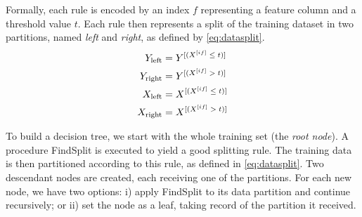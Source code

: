 Formally, each rule is encoded by an index $f$ representing a feature column and a threshold value $t$. Each rule then represents a split of the training dataset in two partitions, named \emph{left} and \emph{right}, as defined by \autoref{eq:datasplit}.
%
\begin{equation}
    \begin{split} %
        Y_\text{left} &=Y\el{(X\el{if} \; \le \; t)} \\
        Y_\text{right} &=Y\el{(X\el{if} \; > \; t)} \\
        X_\text{left} &=X\el{(X\el{if} \; \le \; t)} \\
        X_\text{right} &=X\el{(X\el{if} \; > \; t)}
    \end{split}
    \label{eq:datasplit}
\end{equation}

To build a decision tree, we start with the whole training set (the \emph{root node}). A procedure FindSplit is executed to yield a good splitting rule.
The training data is then partitioned according to this rule, as defined in \autoref{eq:datasplit}. Two descendant nodes are created, each receiving one of the partitions.
For each new node, we have two options: i) apply FindSplit to its data partition and continue recursively; or ii) set the node as a leaf, taking record of the partition it received.


